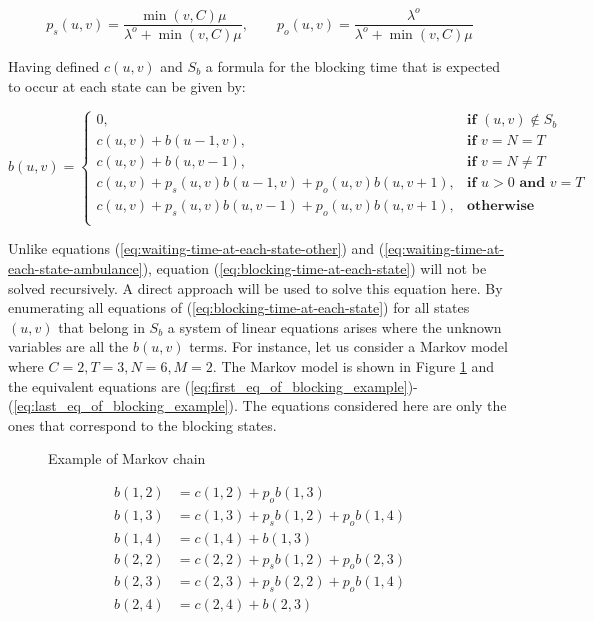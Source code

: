 \begin{equation*}
    p_s(u,v) = \frac{\min(v,C)\mu}{\lambda^o + \min(v,C)\mu}, \qquad
    p_o(u,v) = \frac{\lambda^o}{\lambda^o + \min(v,C)\mu}
\end{equation*}


Having defined \(c(u,v)\) and \(S_b\) a formula for the blocking time that is
expected to occur at each state can be given by:

\begin{equation}\label{eq:blocking-time-at-each-state}
    b(u,v) = 
    \begin{cases} 
        0, & \textbf{if } (u,v) \notin S_b \\
        c(u,v) + b(u - 1, v), & \textbf{if } v = N = T\\
        c(u,v) + b(u, v-1), & \textbf{if } v = N \neq T \\
        c(u,v) + p_s(u,v) b(u-1, v) + p_o(u,v) b(u, v+1), & \textbf{if } u > 0 
        \textbf{ and } v = T \\
        c(u,v) + p_s(u,v) b(u, v-1) + p_o(u,v) b(u, v+1), & \textbf{otherwise} \\
    \end{cases}
\end{equation}

Unlike equations (\ref{eq:waiting-time-at-each-state-other}) and 
(\ref{eq:waiting-time-at-each-state-ambulance}), equation 
(\ref{eq:blocking-time-at-each-state}) will not be solved recursively. 
A direct approach will be used to solve this equation here. 
By enumerating all equations of (\ref{eq:blocking-time-at-each-state}) for all 
states \((u,v)\) that belong in \(S_b\) 
a system of linear equations arises where the unknown variables are all the \(b(u,v)\)
terms.
For instance, let us consider a Markov model where \(C=2, T=3, N=6, M=2\). 
The Markov model is shown in Figure \ref{fig:example-algeb-blocking}
and the equivalent equations are 
(\ref{eq:first_eq_of_blocking_example})-(\ref{eq:last_eq_of_blocking_example}).
The equations considered here are only the ones that correspond to the blocking 
states.

\begin{multicols*}{2}
    \begin{figure}[H]
        \scalebox{0.50}{}
        \caption{Example of Markov chain}
        \label{fig:example-algeb-blocking}
    \end{figure}
    \columnbreak
    \begin{align}
        b(1,2) &= c(1,2) + p_o b(1,3) \label{eq:first_eq_of_blocking_example} \\
        b(1,3) &= c(1,3) + p_s b(1,2) + p_o b(1,4) \\
        b(1,4) &= c(1,4) + b(1,3) \\
        b(2,2) &= c(2,2) + p_s b(1,2) + p_o b(2,3) \\
        b(2,3) &= c(2,3) + p_s b(2,2) + p_o b(1,4) \\
        b(2,4) &= c(2,4) + b(2,3)\label{eq:last_eq_of_blocking_example}
    \end{align}
\end{multicols*}

